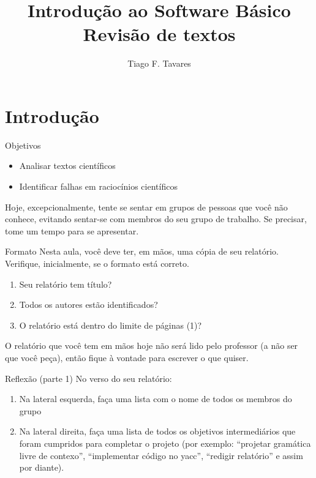 \documentclass{beamer}
\title[T1-Trabalho 1]{Introdução ao Software Básico\\Revisão de textos}
\author{Tiago F. Tavares}
\institute{FEEC -- UNICAMP}
\date{}
\begin{document}
\begin{frame}
  \titlepage
\end{frame}


\section{Introdução}

\begin{frame}{Objetivos}
  \Large
  \begin{itemize}
    \item Analisar textos científicos
    \item Identificar falhas em raciocínios científicos
  \end{itemize}

Hoje, excepcionalmente, tente se sentar em grupos de pessoas que você não conhece,
  evitando sentar-se com membros do seu grupo de trabalho. Se precisar, tome um
  tempo para se apresentar.
\end{frame}

\begin{frame}[fragile]{Formato}
  \centering
  \Large
  Nesta aula, você deve ter, em mãos, uma cópia de seu relatório. Verifique,
  inicialmente, se o formato está correto.
  \begin{enumerate}
    \item Seu relatório tem título?
    \item Todos os autores estão identificados?
    \item O relatório está dentro do limite de páginas (1)?
  \end{enumerate}
  O relatório que você tem em mãos hoje não será lido pelo professor (a não ser
  que você peça), então fique à vontade para escrever o que quiser.
\end{frame}

\begin{frame}[fragile]{Reflexão (parte 1)}
  \centering
  \Large
  No verso do seu relatório:
  \begin{enumerate}
    \item Na lateral esquerda, faça uma lista com o nome de todos os membros do
      grupo
    \item Na lateral direita, faça uma lista de todos os objetivos intermediários
    que foram cumpridos para completar o projeto (por exemplo: ``projetar
    gramática livre de contexo'', ``implementar código no
    yacc'', ``redigir relatório'' e assim por diante).

  \end{enumerate}

\end{frame}
\end{document}
